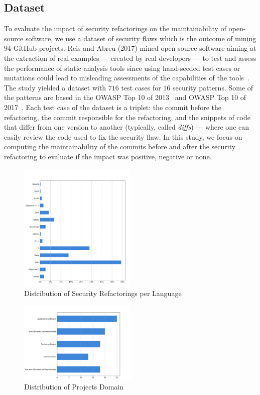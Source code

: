 \documentclass[10pt,conference]{IEEEtran}
\begin{document}
\subsection{Dataset}
%
To evaluate the impact of security refactorings on the maintainability of
open-source software, we use a dataset of security flaws which is the outcome of
mining $94$ GitHub projects. Reis and Abreu (2017) mined open-source
software aiming at the extraction of real examples --- created by real
developers --- to test and assess the performance of static analysis tools since
using hand-seeded test cases or mutations could lead to misleading assessments
of the capabilities of the tools~\cite{just2014mutants}. The study yielded a
dataset with $716$ test cases for $16$ security patterns. Some of the patterns
are based in the OWASP Top 10 of 2013~\cite{oswap:2013} and OWASP Top 10 of
2017~\cite{oswap:2017}. Each test case of the
dataset is a triplet: the commit before the refactoring, the commit responsible
for the refactoring, and the snippets of code that differ from one version to
another (typically, called \textit{diffs}) --- where one can easily review the
code used to fix the security flaw. In this study, we focus on computing the
maintainability of the commits before and after the security refactoring to
evaluate if the impact was positive, negative or none.

\begin{figure}[h]
 	\centering 	\includegraphics[width=0.5\textwidth]{figures/language_dist.pdf}
 	\caption{Distribution of Security Refactorings per Language}
	\label{fig:lang}
\end{figure}

\begin{figure}[h]
 	\centering 	\includegraphics[width=0.5\textwidth]{figures/type_dist.pdf}
 	\caption{Distribution of Projects Domain}
	\label{fig:domain}
\end{figure}
\end{document}
